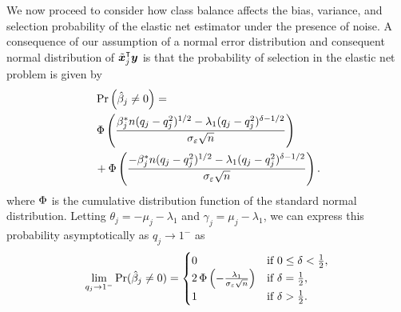 We now proceed to consider how class balance affects the bias, variance, and selection
probability of the elastic net estimator under the presence of noise. A consequence of our
assumption of a normal error distribution and consequent normal distribution of
\(\tilde{\bm{x}}_j^\intercal \bm{y}\) is that the probability of selection in the elastic net
problem is given by
\begin{align}
  \label{eq:selection-probability}
   & \Pr\left(\hat{\beta}_j \neq 0\right) =                                                                                                       \nonumber
  \\
   & \operatorname{\Phi} \left( \frac{\beta_j^*n (q_j-q_j^2)^{1/2} - \lambda_1(q_j-q_j^2)^{\delta - 1/2}}{\sigma_\varepsilon \sqrt{n}}\right)                \nonumber     \\
   & + \operatorname{\Phi} \left( \frac{-\beta_j^*n (q_j-q_j^2)^{1/2} - \lambda_1(q_j-q_j^2)^{\delta - 1/2}}{\sigma_\varepsilon \sqrt{n}}\right).
\end{align}
where \(\operatorname{\Phi}\) is the cumulative distribution function of the standard normal distribution.
Letting \(\theta_j = -\mu_j - \lambda_1 \) and \(\gamma_j = \mu_j - \lambda_1\), we can
express this probability asymptotically as \(q_j \rightarrow 1^-\) as
\begin{equation}
  \label{eq:selection-probability-limit}
  \lim_{q_j \rightarrow 1^-} \Pr(\hat{\beta}_j \neq 0) =
  \begin{cases}
    0                                                                & \text{if } 0 \leq \delta < \frac{1}{2}, \\
    2\operatorname{\Phi}\left(-\frac{\lambda_1}{\sigma_\varepsilon \sqrt{n}}\right) & \text{if } \delta = \frac{1}{2},        \\
    1                                                                & \text{if } \delta > \frac{1}{2}.
  \end{cases}
\end{equation}

